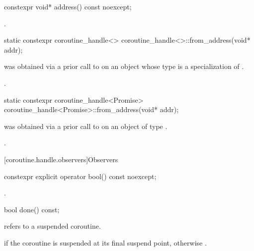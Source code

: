 %
\begin{itemdecl}
constexpr void* address() const noexcept;
\end{itemdecl}

\begin{itemdescr}
\pnum
\returns
{}.
\end{itemdescr}

%
\begin{itemdecl}
static constexpr coroutine_handle<> coroutine_handle<>::from_address(void* addr);
\end{itemdecl}

\begin{itemdescr}
\pnum
\expects
{} was obtained via a prior call to 
on an object whose type is a specialization of .

\pnum
\ensures
{}.
\end{itemdescr}

%
\begin{itemdecl}
static constexpr coroutine_handle<Promise> coroutine_handle<Promise>::from_address(void* addr);
\end{itemdecl}

\begin{itemdescr}
\pnum
\expects
{} was obtained via a prior call to 
on an object of type \cv {}.

\pnum
\ensures
{}.
\end{itemdescr}

[coroutine.handle.observers]{Observers}

%
\begin{itemdecl}
constexpr explicit operator bool() const noexcept;
\end{itemdecl}

\begin{itemdescr}
\pnum
\returns
{}.
\end{itemdescr}

%
\begin{itemdecl}
bool done() const;
\end{itemdecl}

\begin{itemdescr}
\pnum
\expects
{} refers to a suspended coroutine.

\pnum
\returns
{} if the coroutine is suspended at its
final suspend point, otherwise .
\end{itemdescr}


